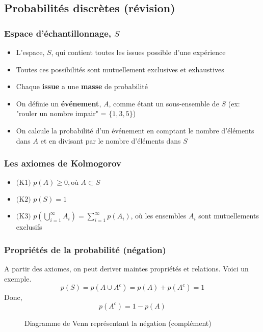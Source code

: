 \documentclass{beamer}
\begin{document}
\subsection{Probabilités discrètes (révision)}

\begin{frame}
    \frametitle{Espace d'échantillonnage, $S$}
    \begin{itemize}
      \item L'espace, $S$, qui contient toutes les issues possible d'une expérience
      \pause
      \item Toutes ces possibilités sont mutuellement exclusives et exhaustives
      \pause
      \item Chaque \textbf{issue} a une \textbf{masse} de probabilité
      \pause
      \item On définie un \textbf{événement}, $A$, comme étant un sous-ensemble de $S$ (ex: "rouler un nombre impair" = $\{1,3,5\}$)
      \pause
      \item On calcule la probabilité d'un événement en comptant le nombre d'éléments dans $A$ et en divisant par le nombre d'éléments dans $S$
    \end{itemize}
\end{frame}


\begin{frame}
    \frametitle{Les axiomes de Kolmogorov}
    \begin{itemize}
      \item $\textrm{(K1)} \, \, p(A) \geq 0, \textrm{où} \, \, A \subset S$
      \pause
      \item $\textrm{(K2)} \, \, p(S) = 1$
      \pause
      \item $\textrm{(K3)} \, \, p(\bigcup_{i=1}^{\infty} A_i) = \sum_{i=1}^{\infty} p(A_i)$, où les ensembles $A_i$ sont mutuellements exclusifs
    \end{itemize}
\end{frame}


\begin{frame}
    \frametitle{Propriétés de la probabilité (négation)}
    A partir des axiomes, on peut deriver maintes propriétés et relations. Voici un exemple.\\
    \pause
    \[p(S) = p(A \cup A^c) = p(A) + p(A^c) = 1\]
    \pause
    Donc,
    \[p(A^c) = 1 - p(A)\]
    \pause
    \begin{figure}
      \centering
      \scalebox{1}{}
      \caption{Diagramme de Venn représentant la négation (complément)}
    \end{figure}    
\end{frame}
\end{document}
